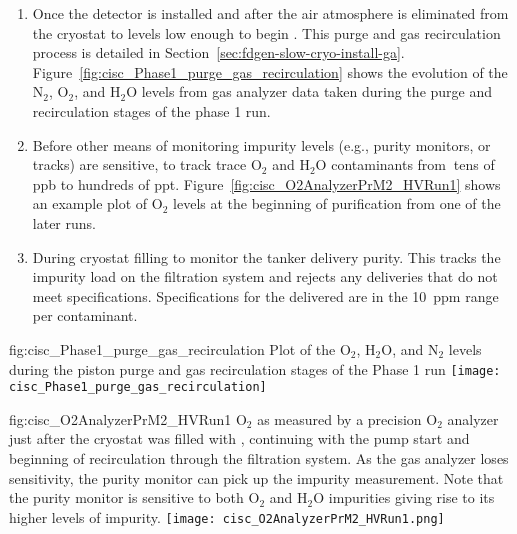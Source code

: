 \begin{enumerate}
\item Once the detector is installed and after the air atmosphere is eliminated from the cryostat to levels low enough to begin \cooldown. This purge and gas recirculation process is detailed in Section~\ref{sec:fdgen-slow-cryo-install-ga}. Figure~\ref{fig:cisc_Phase1_purge_gas_recirculation} shows the evolution of the $\text{N}_2$, $\text{O}_2$, and $\text{H}_2\text{O}$ levels from gas analyzer data taken during the purge and recirculation stages of the   %
phase 1 run.


\item Before other means of monitoring impurity levels (e.g., purity monitors, or  tracks) are sensitive, to track trace $\text{O}_2$ and $\text{H}_2\text{O}$ contaminants from $\>$tens of ppb to hundreds of ppt.  Figure~\ref{fig:cisc_O2AnalyzerPrM2_HVRun1} shows an example plot of $\text{O}_2$ levels at the beginning of  purification from one of the later   runs.

\item During cryostat filling to monitor the tanker  delivery purity. This tracks the impurity load on the filtration system and rejects any deliveries that do not meet specifications. %
Specifications for the delivered  are in the \SI{10}{ppm} range per contaminant.

\end{enumerate}

\begin{dunefigure}{fig:cisc_Phase1_purge_gas_recirculation}
  {Plot of the $\text{O}_2$, $\text{H}_2\text{O}$, and $\text{N}_2$ levels during the piston purge and gas recirculation stages of the  Phase 1 run}
  \texttt{[image: cisc\_Phase1\_purge\_gas\_recirculation]}
\end{dunefigure}

\begin{dunefigure}{fig:cisc_O2AnalyzerPrM2_HVRun1}
  {$\text{O}_2$ as measured by a precision $\text{O}_2$ analyzer just after the  cryostat was filled with , continuing with the  pump start and beginning of  recirculation through the filtration system. As the gas analyzer loses sensitivity, the purity monitor can pick up the impurity measurement. Note that the purity monitor is sensitive to both $\text{O}_2$ and $\text{H}_2\text{O}$ impurities giving rise to its higher levels of impurity.}
  \texttt{[image: cisc\_O2AnalyzerPrM2\_HVRun1.png]}
\end{dunefigure}

